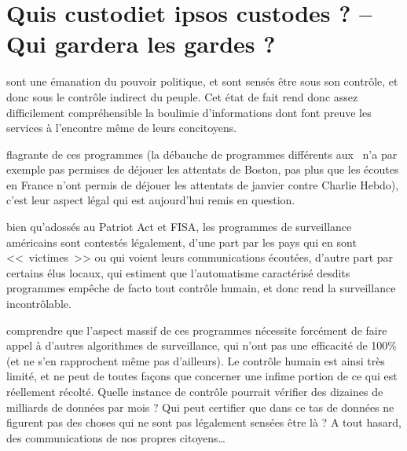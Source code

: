 
\chapter{Quis custodiet ipsos custodes ? -- Qui gardera les gardes ?}
\label{impact}

\begin{doublespace}
\noindent\fontsize{18}{22}\selectfont\itshape
\nohyphenation
{}
\end{doublespace}

 sont une émanation du pouvoir
politique, et sont sensés être sous son contrôle, et donc sous le contrôle
indirect du peuple. Cet état de fait rend donc assez difficilement
compréhensible la boulimie d'informations dont font preuve les services à
l'encontre même de leurs  concitoyens.

 flagrante de ces programmes\cite{surve}
(la débauche de programmes différents aux \EUA~n'a par exemple pas permises de
déjouer les attentats de Boston, pas plus que les écoutes en France n'ont permis de déjouer
les attentats de janvier contre Charlie Hebdo), c'est leur aspect légal qui est
aujourd'hui remis en question.

 bien qu'adossés au Patriot Act et FISA, les programmes
de surveillance américains sont contestés légalement, d'une part par les pays qui
en sont <<~victimes~>> ou qui voient leurs communications écoutées, d'autre part
par certains élus locaux, qui estiment que l'automatisme caractérisé desdits
programmes empêche de facto tout contrôle humain, et donc rend la surveillance
incontrôlable.

 comprendre que l'aspect massif de ces programmes
nécessite forcément de faire appel à d'autres algorithmes de surveillance, qui
n'ont pas une efficacité de 100\% (et ne s'en rapprochent même pas d'ailleurs).
Le contrôle humain est ainsi très limité, et ne peut de toutes façons que
concerner une infime portion de ce qui est réellement récolté. Quelle instance
de contrôle pourrait vérifier des dizaines de milliards de données par mois ?
Qui peut certifier que dans ce tas de données ne figurent pas des choses qui ne
sont pas légalement sensées être là ? A tout hasard, des communications de nos propres
citoyens\ldots 

